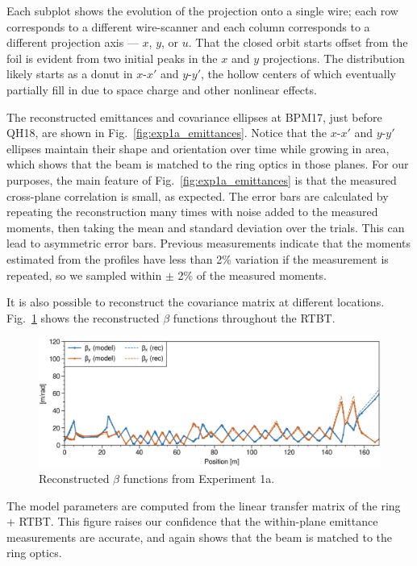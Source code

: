 %
Each subplot shows the evolution of the projection onto a single wire; each row corresponds to a different wire-scanner and each column corresponds to a different projection axis — $x$, $y$, or $u$. That the closed orbit starts offset from the foil is evident from two initial peaks in the $x$ and $y$ projections. The distribution likely starts as a donut in $x$-$x'$ and $y$-$y'$, the hollow centers of which eventually partially fill in due to space charge and other nonlinear effects.

The reconstructed emittances and covariance ellipses at BPM17, just before QH18, are shown in Fig.~\ref{fig:exp1a_emittances}. Notice that the $x$-$x'$ and $y$-$y'$ ellipses maintain their shape and orientation over time while growing in area, which shows that the beam is matched to the ring optics in those planes. For our purposes, the main feature of Fig.~\ref{fig:exp1a_emittances} is that the measured cross-plane correlation is small, as expected. The error bars are calculated by repeating the reconstruction many times with noise added to the measured moments, then taking the mean and standard deviation over the trials. This can lead to asymmetric error bars. Previous measurements indicate that the moments estimated from the profiles have less than 2\% variation if the measurement is repeated, so we sampled within $\pm$ 2\% of the measured moments.

It is also possible to reconstruct the covariance matrix at different locations. Fig.~\ref{fig:exp1a_rec_betas_throughout} shows the reconstructed $\beta$ functions throughout the RTBT.
%
\begin{figure}[!p]
    \centering
    \includegraphics[width=1.0\textwidth]{Images/chapter5/exp1a/rec_betas_throughout.png}
    \caption{Reconstructed $\beta$ functions from Experiment 1a.}
    \label{fig:exp1a_rec_betas_throughout}
\end{figure}
%
The model parameters are computed from the linear transfer matrix of the ring + RTBT. This figure raises our confidence that the within-plane emittance measurements are accurate, and again shows that the beam is matched to the ring optics.



